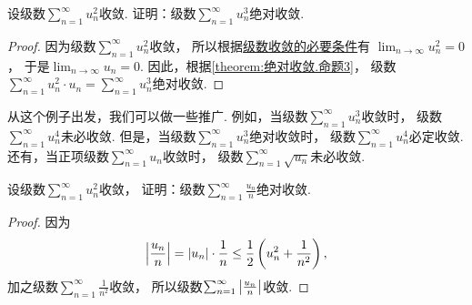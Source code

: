 \begin{example}
设级数\(\sum_{n=1}^\infty u_n^2\)收敛.
证明：级数\(\sum_{n=1}^\infty u_n^3\)绝对收敛.
\begin{proof}
因为级数\(\sum_{n=1}^\infty u_n^2\)收敛，
所以根据\hyperref[theorem:无穷级数.级数收敛的必要条件]{级数收敛的必要条件}有
\(\lim_{n\to\infty} u_n^2 = 0\)，
于是\(\lim_{n\to\infty} u_n = 0\).
因此，根据\cref{theorem:绝对收敛.命题3}，
级数\(\sum_{n=1}^\infty u_n^2 \cdot u_n
= \sum_{n=1}^\infty u_n^3\)绝对收敛.
\end{proof}
\end{example}
从这个例子出发，我们可以做一些推广.
例如，当级数\(\sum_{n=1}^\infty u_n^3\)收敛时，
级数\(\sum_{n=1}^\infty u_n^4\)未必收敛.
但是，当级数\(\sum_{n=1}^\infty u_n^3\)绝对收敛时，
级数\(\sum_{n=1}^\infty u_n^4\)必定收敛.
还有，当正项级数\(\sum_{n=1}^\infty u_n\)收敛时，
级数\(\sum_{n=1}^\infty \sqrt{u_n}\)未必收敛.

\begin{example}
设级数\(\sum_{n=1}^\infty u_n^2\)收敛，
证明：级数\(\sum_{n=1}^\infty \frac{u_n}{n}\)绝对收敛.
\begin{proof}
因为\begin{equation*}
	\abs{\frac{u_n}{n}}
	= \abs{u_n} \cdot \frac{1}{n}
	\leq \frac12 \left( u_n^2 + \frac{1}{n^2} \right),
\end{equation*}
加之级数\(\sum_{n=1}^\infty \frac{1}{n^2}\)收敛，
所以级数\(\sum_{n=1}^\infty \abs{\frac{u_n}{n}}\)收敛.
\end{proof}
\end{example}
